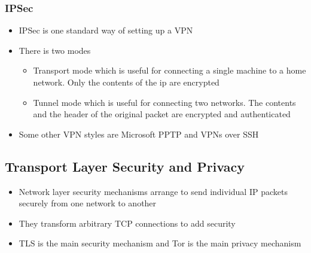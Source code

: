 \documentclass[twoside]{article}
\begin{document}
\subsubsection{IPSec}
\begin{itemize}
\item IPSec is one standard way of setting up a VPN
\item There is two modes
\begin{itemize}
\item Transport mode which is useful for connecting a single machine to a home network. Only the contents of the ip are encrypted
\item Tunnel mode which is useful for connecting two networks. The contents and the header of the original packet are encrypted and authenticated
\end{itemize}
\item Some other VPN styles are Microsoft PPTP and VPNs over SSH
\end{itemize}

\subsection{Transport Layer Security and Privacy}
\begin{itemize}
\item Network layer security mechanisms arrange to send individual IP packets securely from one network to another
\item They transform arbitrary TCP connections to add security
\item TLS is the main security mechanism and Tor is the main privacy mechanism
\end{itemize}
\end{document}
